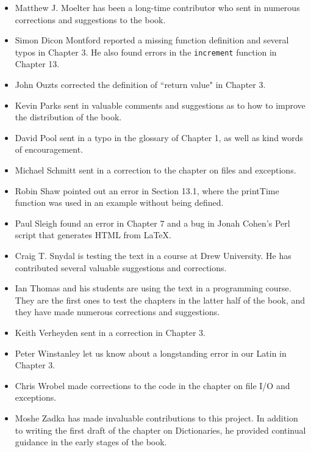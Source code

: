 \documentclass[10pt]{book}
\begin{document}
\begin{itemize}
\item Matthew J. Moelter has been a long-time contributor who sent
in numerous corrections and suggestions to the book.  

\item Simon Dicon Montford reported a missing function definition and
several typos in Chapter 3.  He also found errors in the {\tt increment}
function in Chapter 13.

\item John Ouzts corrected the definition of ``return value"
in Chapter 3.

\item Kevin Parks sent in valuable comments and suggestions as to how
to improve the distribution of the book.

\item David Pool sent in a typo in the glossary of Chapter 1, as well
as kind words of encouragement.

\item Michael Schmitt sent in a correction to the chapter on files
and exceptions.

\item Robin Shaw pointed out an error in Section 13.1, where the
printTime function was used in an example without being defined.

\item Paul Sleigh found an error in Chapter 7 and a bug in Jonah Cohen's
Perl script that generates HTML from LaTeX.

\item Craig T. Snydal is testing the text in a course at Drew
University.  He has contributed several valuable suggestions and corrections.

\item Ian Thomas and his students are using the text in a programming
course.  They are the first ones to test the chapters in the latter half
of the book, and they have made numerous corrections and suggestions.

\item Keith Verheyden sent in a correction in Chapter 3.

\item Peter Winstanley let us know about a longstanding error in
our Latin in Chapter 3.

\item Chris Wrobel made corrections to the code in the chapter on
file I/O and exceptions. 

\item Moshe Zadka has made invaluable contributions to this project.
In addition to writing the first draft of the chapter on Dictionaries, he
provided continual guidance in the early stages of the book.


\end{itemize}
\end{document}
